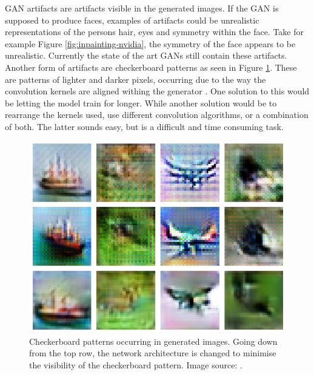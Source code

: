 GAN artifacts are artifacts visible in the generated images. If the GAN is supposed to produce faces, examples of artifacts could be unrealistic representations of the persons hair, eyes and symmetry within the face. Take for example Figure \ref{fig:inpainting-nvidia}, the symmetry of the face appears to be unrealistic. Currently the state of the art GANs still contain these artifacts. Another form of artifacts are checkerboard patterns as seen in Figure \ref{fig:checkerboard}. These are patterns of lighter and darker pixels, occurring due to the way the convolution kernels are aligned withing the generator \cite{odena2016deconvolution}. One solution to this would be letting the model train for longer. While another solution would be to rearrange the kernels used, use different convolution algorithms, or a combination of both. The latter sounds easy, but is a difficult and time consuming task.

\begin{figure} [!htb]
    \centering
    \includegraphics[scale=0.6]{figuren/checkerboard.png}
    \caption{Checkerboard patterns occurring in generated images. Going down from the top row, the network architecture is changed to minimise the visibility of the checkerboard pattern. Image source: \cite{odena2016deconvolution}.}
    \label{fig:checkerboard}
\end{figure}


















